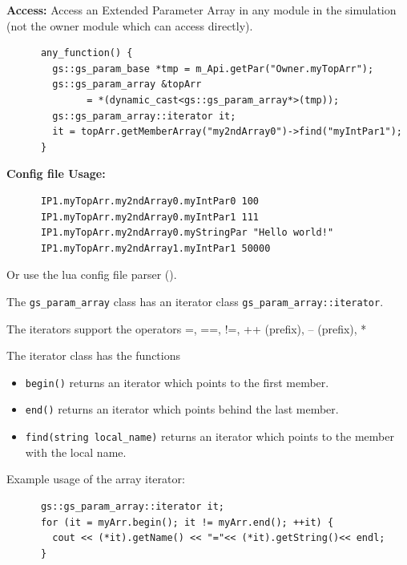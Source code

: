 \noindent
\begin{minipage}{\textwidth}
{\bf Access:} Access an Extended Parameter Array in any module in the simulation (not the owner module which can access directly).
\begin{lstlisting}
      any_function() {
        gs::gs_param_base *tmp = m_Api.getPar("Owner.myTopArr");
        gs::gs_param_array &topArr 
              = *(dynamic_cast<gs::gs_param_array*>(tmp));
        gs::gs_param_array::iterator it;
        it = topArr.getMemberArray("my2ndArray0")->find("myIntPar1");
      }
\end{lstlisting}
\end{minipage}

\noindent
\begin{minipage}{\textwidth}
{\bf Config file Usage:}
\begin{lstlisting}
      IP1.myTopArr.my2ndArray0.myIntPar0 100
      IP1.myTopArr.my2ndArray0.myIntPar1 111
      IP1.myTopArr.my2ndArray0.myStringPar "Hello world!"
      IP1.myTopArr.my2ndArray1.myIntPar1 50000
\end{lstlisting}
Or use the lua config file parser ().
\end{minipage}

\vspace{.5cm}
The \lstinline|gs_param_array| class has an iterator class \lstinline|gs_param_array::iterator|.

The iterators support the operators \textsf{=, ==, !=, ++ (prefix), -- (prefix), *}

The iterator class has the functions
\begin{itemize}
    \item \lstinline|begin()| returns an iterator which points to the first member.
    \item \lstinline|end()| returns an iterator which points behind the last member.
    \item \lstinline|find(string local_name)| returns an iterator which points to the member with the local name.
\end{itemize}

Example usage of the array iterator:
\begin{lstlisting}
      gs::gs_param_array::iterator it;
      for (it = myArr.begin(); it != myArr.end(); ++it) {
        cout << (*it).getName() << "="<< (*it).getString()<< endl;
      }
\end{lstlisting}




